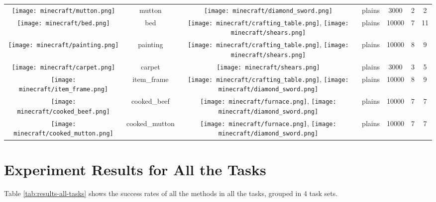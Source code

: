 \documentclass{article}
\newcommand{\mcbed}{\texttt{[image: minecraft/bed.png]}}
\newcommand{\mccarpet}{\texttt{[image: minecraft/carpet.png]}}
\newcommand{\mccookedbeef}{\texttt{[image: minecraft/cooked\_beef.png]}}
\newcommand{\mccookedmutton}{\texttt{[image: minecraft/cooked\_mutton.png]}}
\newcommand{\mccraftingtable}{\texttt{[image: minecraft/crafting\_table.png]}}
\newcommand{\mcdiamondsword}{\texttt{[image: minecraft/diamond\_sword.png]}}
\newcommand{\mcfurnace}{\texttt{[image: minecraft/furnace.png]}}
\newcommand{\mcitemframe}{\texttt{[image: minecraft/item\_frame.png]}}
\newcommand{\mcmutton}{\texttt{[image: minecraft/mutton.png]}}
\newcommand{\mcpainting}{\texttt{[image: minecraft/painting.png]}}
\newcommand{\mcshears}{\texttt{[image: minecraft/shears.png]}}
\begin{document}
\begin{table}[htbp]
\begin{tabular}{ccccccc}
    \mcmutton  & mutton & \mcdiamondsword & plains & 3000 & 2 & 2 \\
    \mcbed  &  bed & \mccraftingtable, \mcshears & plains & 10000 & 7 & 11 \\
    \mcpainting  & painting & \mccraftingtable, \mcshears & plains & 10000 & 8 & 9 \\
    \mccarpet  & carpet  & \mcshears & plains & 3000 & 3 & 5 \\
    \mcitemframe  & item\_frame & \mccraftingtable, \mcdiamondsword & plains & 10000 & 8 & 9 \\
    \mccookedbeef  & cooked\_beef & \mcfurnace, \mcdiamondsword & plains & 10000 & 7 & 7 \\
    \mccookedmutton  & cooked\_mutton & \mcfurnace, \mcdiamondsword & plains & 10000 & 7 & 7 \\
    \bottomrule
  \end{tabular}
\end{table}

\section{Experiment Results for All the Tasks}
Table \ref{tab:results-all-tasks} shows the success rates of all the methods in all the tasks, grouped in 4 task sets.
\end{document}
